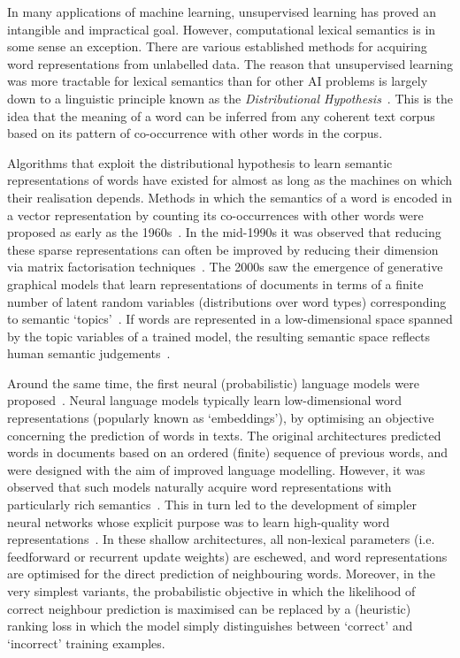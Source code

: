 
In many applications of machine learning, unsupervised learning has proved an intangible and impractical goal. However, computational lexical semantics is in some sense an exception. There are various established methods for acquiring word representations from unlabelled data. The reason that unsupervised learning was more tractable for lexical semantics than for other AI problems is largely down to a linguistic principle known as the \emph{Distributional Hypothesis}~\citep{dist}. This is the idea that the meaning of a word can be inferred from any coherent text corpus based on its pattern of co-occurrence with other words in the corpus. 

Algorithms that exploit the distributional hypothesis to learn semantic representations of words have existed for almost as long as the machines on which their realisation depends. Methods in which the semantics of a word is encoded in a vector representation by counting its co-occurrences with other words were proposed as early as the 1960s~\citep{cordier1965,harper1965}. In the mid-1990s it was observed that reducing these sparse representations can often be improved by reducing their dimension via matrix factorisation techniques~\citep{landauer1997solution}. The 2000s saw the emergence of generative graphical models that learn representations of documents in terms of a finite number of latent random variables (distributions over word types) corresponding to semantic `topics'~\citep{blei2003latent}. If words are represented in a low-dimensional space spanned by the topic variables of a trained model, the resulting semantic space reflects human semantic judgements~\citep{griffiths2007topics}. 

Around the same time, the first neural (probabilistic) language models were proposed~\citep{bengio2003neural}. Neural language models typically learn low-dimensional word representations (popularly known as `embeddings'), by optimising an objective concerning the prediction of words in texts. The original architectures predicted words in documents based on an ordered (finite) sequence of previous words, and were designed with the aim of improved language modelling. However, it was observed that such models naturally acquire word representations with particularly rich semantics~\citep{collobert2008unified}. This in turn led to the development of simpler neural networks whose explicit purpose was to learn high-quality word representations~\citep{mikolov2013efficient}. In these shallow architectures, all non-lexical parameters (i.e. feedforward or recurrent update weights) are eschewed, and word representations are optimised for the direct prediction of neighbouring words. Moreover, in the very simplest variants, the probabilistic objective in which the likelihood of correct neighbour prediction is maximised can be replaced by a (heuristic) ranking loss in which the model simply distinguishes between `correct' and `incorrect' training examples. 

